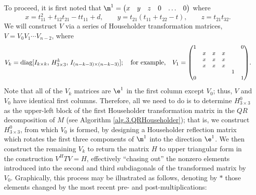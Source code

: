 To proceed, it is first noted that $\m^1 = \begin{pmatrix} x & y & z & 0 & \ldots & 0 \end{pmatrix}$ where
\begin{equation*}
x=t_{11}^2 + t_{12} t_{21} - t t_{11} + d, \qquad y=t_{21}(t_{11}+t_{22} - t), \qquad z=t_{21} t_{32}.
\end{equation*}
We will construct $V$ via a series of Householder transformation matrices, $V=V_0 V_1 \cdots V_{n-2}$, where
\begin{equation*}
V_k=\textrm{diag}[ I_{k\times k},\,H^k_{3\times 3},\, I_{(n-k-3)\times (n-k-3)} ]; \quad \textrm{for example,} \quad
V_1={\footnotesize \begin{pmatrix} 1 &  &  &  &  & 0 \\  & x & x & x &  &  \\  & x & x & x &  &  \\  & x & x & x &  &  \\  &  &  &  & 1 &  \\ 0 &  &  &  &   & 1 \end{pmatrix}}.
\end{equation*}
Note that all of the $V_k$ matrices are $\e^1$ in the first column except $V_0$; thus, $V$ and $V_0$ have identical first columns.
Therefore, all we need to do is to determine $H^0_{3\times 3}$ as the upper-left block of the first Householder transformation matrix in the $QR$ decomposition
of $M$ (see Algorithm \ref{alg.3.QRHouseholder}); that is, we construct $H^0_{3\times 3}$, from which $V_0$ is formed, by designing a Householder reflection matrix which rotates the first three components of $\m^1$ into the direction $\e^1$.
We then construct the remaining $V_k$ to return the matrix $H$ to upper triangular form in the construction $V^H T V=H$, effectively ``chasing out'' the nonzero elements introduced into the second and third subdiagonals of the
transformed matrix by $V_0$.  Graphically, this process may be illustrated as follows, denoting by $*$ those elements changed by the most recent pre- and post-multiplications:
